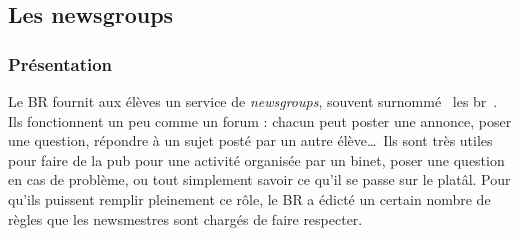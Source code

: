 \subsection{Les newsgroups}
\label{newsgroups}
\subsubsection{Présentation}
Le BR fournit aux élèves un service de \emph{newsgroups}, souvent surnommé \guillemotleft~les br~\guillemotright . Ils fonctionnent un peu comme un
forum : chacun peut poster une annonce, poser une question,
 répondre à un sujet posté par un autre élève\ldots\
Ils sont très utiles pour faire de la pub pour une activité
organisée par un binet, poser une question en cas de problème, ou
tout simplement savoir ce qu'il se passe sur le platâl. Pour qu'ils
puissent remplir pleinement ce rôle, le BR a édicté un certain
nombre de règles que les newsmestres sont chargés de faire
respecter.

